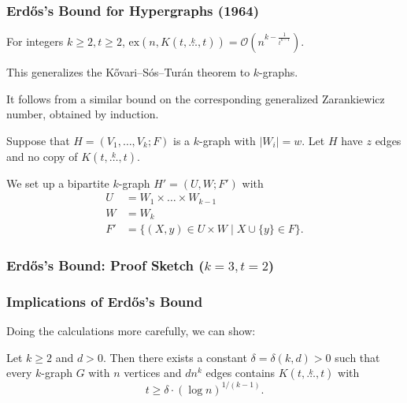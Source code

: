 \documentclass[aspectratio=169]{beamer}
\newcommand{\ex}[2]{\ensuremath{\text{ex} \left( #1, #2 \right)}}
\newcommand{\compoverset}[2]{\ensuremath{K\left(#2, \overset{#1}{\dots}, #2\right)}} %
\newcommand{\bigO}[1]{\ensuremath{\mathcal{O}\left(#1\right)}}
\theoremstyle{mystyle}
\begin{document}
\begin{frame}
    \frametitle{Erd\H{o}s's Bound for Hypergraphs (1964)}

    \begin{theorem}[Erd\H{o}s '64]
        For integers $k \ge 2, t \ge 2$,
        $\ex{n}{\compoverset{k}{t}} = \bigO{n^{k - \frac{1}{t^{k-1}}}}.$
    \end{theorem}

    This generalizes the Kővari--Sós--Turán theorem to $k$-graphs.

    It follows from a similar bound on the corresponding generalized Zarankiewicz number,
    obtained by induction.

    Suppose that $H = (V_1, \dots, V_k; F)$ is a $k$-graph with $|W_i| = w$.
    Let $H$ have $z$ edges and no copy of $\compoverset{k}{t}$.

    We set up a bipartite $k$-graph $H' = (U, W; F')$ with
    \begin{align*}
        U &=  W_1 \times \dots \times W_{k-1} \\
        W &= W_k \\
        F' &= \{(X, y) \in U \times W \mid X \cup \{y\} \in F\}.
    \end{align*}

\end{frame}

\begin{frame}[fragile]
    \frametitle{Erd\H{o}s's Bound: Proof Sketch ($k=3, t=2$)}

    \begin{adjustwidth}{-0.5cm}{0cm} %

        \begin{figure}
            \centering
            \scalebox{0.6}{
                
            }
        \end{figure}

    \end{adjustwidth}

\end{frame}

\begin{frame}
    \frametitle{Implications of Erdős's Bound}
    Doing the calculations more carefully, we can show:
    \begin{theorem}
        Let $k \geq 2$ and $d > 0$.
        Then there exists a constant $\delta = \delta(k, d) > 0$ such that
        every $k$-graph $G$ with $n$ vertices and $dn^k$ edges
        contains $\compoverset{k}{t}$ with
        \[
            t \geq \delta \cdot (\log n)^{1/(k-1)}.
        \]
    \end{theorem}


\end{frame}
\end{document}
